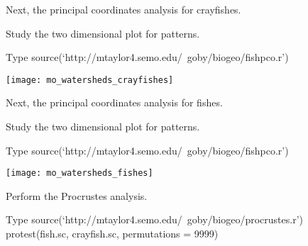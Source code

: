 \documentclass[xcolor=svgnames]{beamer}
\begin{document}
{
\begin{frame}[plain]
\end{frame}
}

{
\begin{frame}[plain]
\end{frame}
}

\begin{frame}[plain]{Next, the principal coordinates analysis for crayfishes.}

Study the two dimensional plot for patterns.
\begin{block}{Type}
	source(`http://mtaylor4.semo.edu/~goby/biogeo/fishpco.r')
\end{block}
\end{frame}


{
\begin{frame}[plain]
\end{frame}
}

\begin{frame}[plain]
	\centering
	\texttt{[image: mo\_watersheds\_crayfishes]}
\end{frame}


\begin{frame}[plain]{Next, the principal coordinates analysis for fishes.}

Study the two dimensional plot for patterns.
\begin{block}{Type}
	source(`http://mtaylor4.semo.edu/~goby/biogeo/fishpco.r')
\end{block}
\end{frame}


{
\begin{frame}[plain]
\end{frame}
}

\begin{frame}[plain]
	\centering
	\texttt{[image: mo\_watersheds\_fishes]}
\end{frame}


\begin{frame}[plain]{Perform the Procrustes analysis.}


\begin{block}{Type}
	source(`http://mtaylor4.semo.edu/~goby/biogeo/procrustes.r')
	\pause
	protest(fish.sc, crayfish.sc, permutations = 9999)
\end{block}
\end{frame}

{
\begin{frame}[plain]
\end{frame}
}
\end{document}
